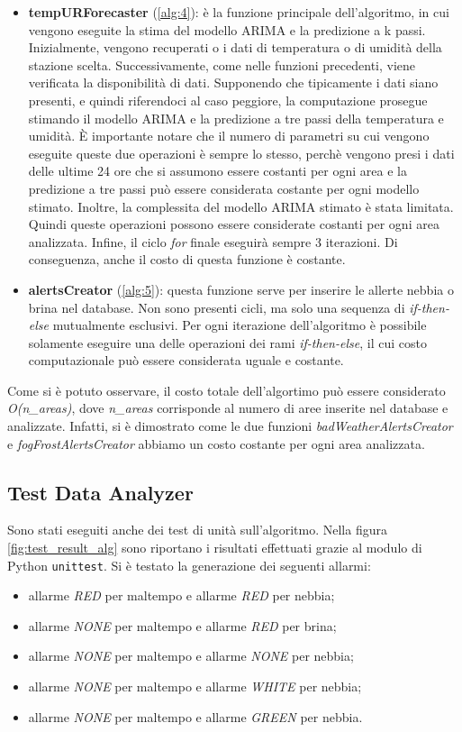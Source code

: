 \begin{itemize}
	\item \textbf{tempURForecaster} (\Alg\ref{alg:4}): è la funzione principale dell'algoritmo, in cui vengono eseguite la stima del modello ARIMA e la predizione a k passi. Inizialmente, vengono recuperati o i dati di temperatura o di umidità della stazione scelta. Successivamente, come nelle funzioni precedenti, viene verificata la disponibilità di dati. Supponendo che tipicamente i dati siano presenti, e quindi riferendoci al caso peggiore, la computazione prosegue stimando il modello ARIMA e la predizione a tre passi della temperatura e umidità. \`E importante notare che il numero di parametri su cui vengono eseguite queste due operazioni è sempre lo stesso, perchè vengono presi i dati delle ultime 24 ore che si assumono essere costanti per ogni area e la predizione a tre passi può essere considerata costante per ogni modello stimato. Inoltre, la complessita del modello ARIMA stimato è stata limitata. Quindi queste operazioni possono essere considerate costanti per ogni area analizzata. Infine, il ciclo \textit{for} finale eseguirà sempre 3 iterazioni. Di conseguenza, anche il costo di questa funzione è costante. 

	\item \textbf{alertsCreator} (\Alg\ref{alg:5}): questa funzione serve per inserire le allerte nebbia o brina nel database. Non sono presenti cicli, ma solo una sequenza di \textit{if-then-else} mutualmente esclusivi. Per ogni iterazione dell'algoritmo è possibile solamente eseguire una delle operazioni dei rami \textit{if-then-else}, il cui costo computazionale può essere considerata uguale e costante.
\end{itemize}

Come si è potuto osservare, il costo totale dell'algortimo può essere considerato \textit{O(n\_areas)}, dove \textit{n\_areas} corrisponde al numero di aree inserite nel database e analizzate. Infatti, si è dimostrato come le due funzioni \textit{badWeatherAlertsCreator} e \textit{fogFrostAlertsCreator} abbiamo un costo costante per ogni area analizzata.

\clearpage

\subsection{Test Data Analyzer}
Sono stati eseguiti anche dei test di unità sull'algoritmo. Nella figura \ref{fig:test_result_alg} sono riportano i risultati effettuati grazie al modulo di Python \texttt{unittest}. Si è testato la generazione dei seguenti allarmi:
\begin{itemize}
	\item allarme \textit{RED} per maltempo e allarme \textit{RED} per nebbia;
	\item allarme \textit{NONE} per maltempo e allarme \textit{RED} per brina;
	\item allarme \textit{NONE} per maltempo e allarme \textit{NONE} per nebbia;
	\item allarme \textit{NONE} per maltempo e allarme \textit{WHITE} per nebbia;
	\item allarme \textit{NONE} per maltempo e allarme \textit{GREEN} per nebbia.
\end{itemize}

